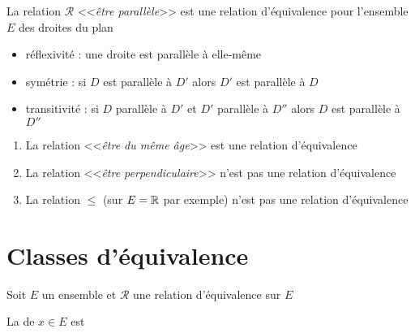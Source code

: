 \begin{frame}

\begin{exemple}
La relation $\mathcal{R}$ <<\emph{être parallèle}>> est une relation d'équivalence 
pour l'ensemble $E$ des droites du plan

\pause

  \begin{itemize}
    \item réflexivité : une droite est parallèle à elle-même
\pause
    \item symétrie : si $D$ est parallèle à $D'$ alors $D'$ est parallèle à $D$
\pause
    \item transitivité : si $D$ parallèle à $D'$ et $D'$ parallèle à $D''$ 
alors $D$ est parallèle à $D''$
  \end{itemize}
\end{exemple}

\pause

\begin{exemple}
\begin{enumerate}
  \item La relation <<\emph{être du même âge}>> est une relation d'équivalence

\pause
  
  \item La relation <<\emph{être perpendiculaire}>> n'est pas une relation d'équivalence 
 
\pause

  \item La relation $\le$ (sur $E=\mathbb{R}$ par exemple) n'est pas une relation d'équivalence

\end{enumerate}
\end{exemple}

\end{frame}

\section{Classes d'équivalence}

\begin{frame}

Soit $E$ un ensemble et $\mathcal{R}$ une relation d'équivalence sur $E$

\begin{mydefinition}
La  de $x \in E$ est 
\end{mydefinition}

\pause


\pause

\end{frame}

